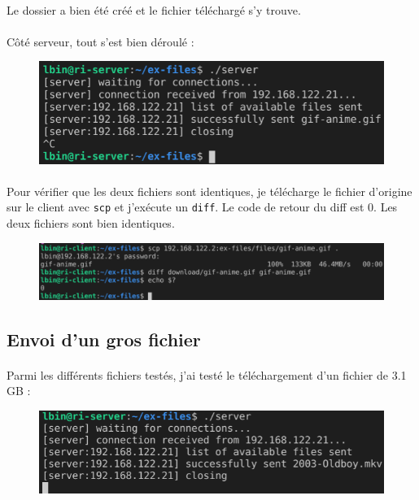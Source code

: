 \documentclass{article}
\begin{document}
    \paragraph{}
    Le dossier a bien été créé et le fichier téléchargé s'y trouve.

    \paragraph{}
    Côté serveur, tout s'est bien déroulé :
    \begin{figure}[H]
        \centering
        \includegraphics[width=.5\textwidth]{./screenshots/cas-nominal-server.png}
    \end{figure}

    \paragraph{}
    Pour vérifier que les deux fichiers sont identiques, je télécharge le fichier d'origine sur le client avec \texttt{scp} et j'exécute un \texttt{diff}. Le code de retour du diff est 0. Les deux fichiers sont bien identiques.
    \begin{figure}[H]
        \centering
        \includegraphics[width=.8\textwidth]{./screenshots/cas-nominal.png}
    \end{figure}


    \subsection{Envoi d'un gros fichier}
    \paragraph{}
    Parmi les différents fichiers testés, j'ai testé le téléchargement d'un fichier de 3.1 GB :

    \begin{figure}[H]
        \centering
        \includegraphics[width=.5\textwidth]{./screenshots/test-big-file-server.png}
    \end{figure}
\end{document}
